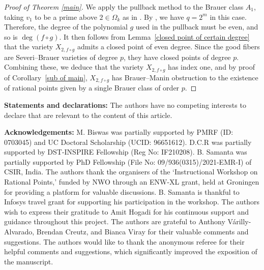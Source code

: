 \documentclass[11pt]{amsart}
\theoremstyle{plain}
\theoremstyle{definition}
\begin{document}
\begin{proof}[{Proof of Theorem \ref{main}}]
We apply the pullback method to the Brauer class $A_1$, taking  $v_1$ to be a prime above $2\in\Omega_k$ as in . 
By \cite[Lemma~4.3]{berg}, we have $q = 2^m$ in this case. 
Therefore, the degree of the polynomial $g$ used in the pullback must be even, and so is $\deg(f \circ g)$. It then follows from Lemma~\ref{closed point of certain degree} that the variety $X_{2, f \circ g}$ admits a closed point of even degree. Since the good fibers are Severi--Brauer varieties of degree $p$, they have closed points of degree $p$. Combining these, we deduce that the variety $X_{2, f \circ g}$ has index one, and by proof of Corollary~\ref{sub of main}, $X_{2, f \circ g}$ has Brauer--Manin obstruction to the existence of rational points given by a single Brauer class of order $p$.
\end{proof}


\textbf{Statements and declarations:} The authors have no competing interests to declare that are relevant to the content of this article.

\vspace{2mm}

\textbf{Acknowledgements:}
    M. Biswas was partially supported by PMRF (ID: 0703045) and UC Doctoral Scholarship (UCID: 96651612). D.C.R was partially supported by DST-INSPIRE Fellowship (Reg No: IF210208). B. Samanta was partially supported by PhD Fellowship (File No: 09/936(0315)/2021-EMR-I) of CSIR, India. The authors thank the organisers of the `Instructional Workshop on Rational Points,' funded by NWO through an ENW-XL grant, held at Groningen for providing a platform for valuable discussions. B. Samanta is thankful to Infosys travel grant for supporting his participation in the workshop. The authors wish to express their gratitude to Amit Hogadi for his continuous support and guidance throughout this project. The authors are grateful to Anthony V\'{a}rilly-Alvarado, Brendan Creutz, and Bianca Viray for their valuable comments and suggestions. The authors would like to thank the anonymous referee for their helpful comments and suggestions, which significantly improved the exposition of the manuscript.
\end{document}
